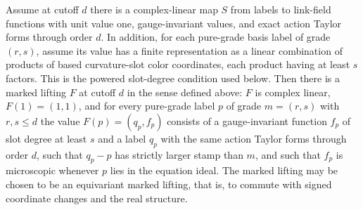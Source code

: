 \begin{theorem}
\label{thm:marked-campaign-producer}
Assume at cutoff $d$ there is a complex-linear map $S$ from labels to
link-field functions with unit value one, gauge-invariant values, and exact
action Taylor forms through order $d$. In addition, for each pure-grade
basis label of grade $(r,s)$, assume its value has a finite representation
as a linear combination of products of based curvature-slot color
coordinates, each product having at least $s$ factors. This is the powered
slot-degree condition used below. Then there is a marked lifting $F$ at cutoff
$d$ in the sense defined above: $F$ is complex linear, $F(1)=(1,1)$, and
for every pure-grade label $p$ of grade $m=(r,s)$ with $r,s\le d$ the
value $F(p)=(q_p,f_p)$ consists of a gauge-invariant function $f_p$ of
slot degree at least $s$ and a label $q_p$ with the same action Taylor
forms through order $d$, such that $q_p-p$ has
strictly larger stamp than $m$, and such that $f_p$ is microscopic
whenever $p$ lies in the equation ideal. The marked lifting may be chosen to
be an equivariant marked lifting, that is, to
commute with signed coordinate changes and the real structure.
\end{theorem}
